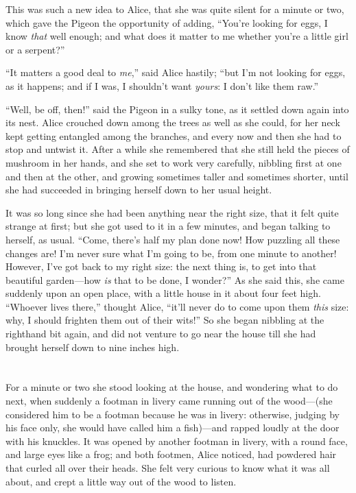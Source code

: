 \documentclass[book, 20pt]{extbook}
\begin{document}
This was such a new idea to Alice, that she was quite silent for a
minute or two, which gave the Pigeon the opportunity of adding, ``You're
looking for eggs, I know \emph{that} well enough; and what does it
matter to me whether you're a little girl or a serpent?''

``It matters a good deal to \emph{me},'' said Alice hastily; ``but I'm
not looking for eggs, as it happens; and if I was, I shouldn't want
\emph{yours}: I don't like them raw.''

``Well, be off, then!'' said the Pigeon in a sulky tone, as it settled
down again into its nest. Alice crouched down among the trees as well as
she could, for her neck kept getting entangled among the branches, and
every now and then she had to stop and untwist it. After a while she
remembered that she still held the pieces of mushroom in her hands, and
she set to work very carefully, nibbling first at one and then at the
other, and growing sometimes taller and sometimes shorter, until she had
succeeded in bringing herself down to her usual height.

It was so long since she had been anything near the right size, that it
felt quite strange at first; but she got used to it in a few minutes,
and began talking to herself, as usual. ``Come, there's half my plan
done now! How puzzling all these changes are! I'm never sure what I'm
going to be, from one minute to another! However, I've got back to my
right size: the next thing is, to get into that beautiful garden---how
\emph{is} that to be done, I wonder?'' As she said this, she came
suddenly upon an open place, with a little house in it about four feet
high. ``Whoever lives there,'' thought Alice, ``it'll never do to come
upon them \emph{this} size: why, I should frighten them out of their
wits!'' So she began nibbling at the righthand bit again, and did not
venture to go near the house till she had brought herself down to nine
inches high.

\chapter*{}


For a minute or two she stood looking at the house, and wondering what
to do next, when suddenly a footman in livery came running out of the
wood---(she considered him to be a footman because he was in livery:
otherwise, judging by his face only, she would have called him a
fish)---and rapped loudly at the door with his knuckles. It was opened
by another footman in livery, with a round face, and large eyes like a
frog; and both footmen, Alice noticed, had powdered hair that curled all
over their heads. She felt very curious to know what it was all about,
and crept a little way out of the wood to listen.
\end{document}
